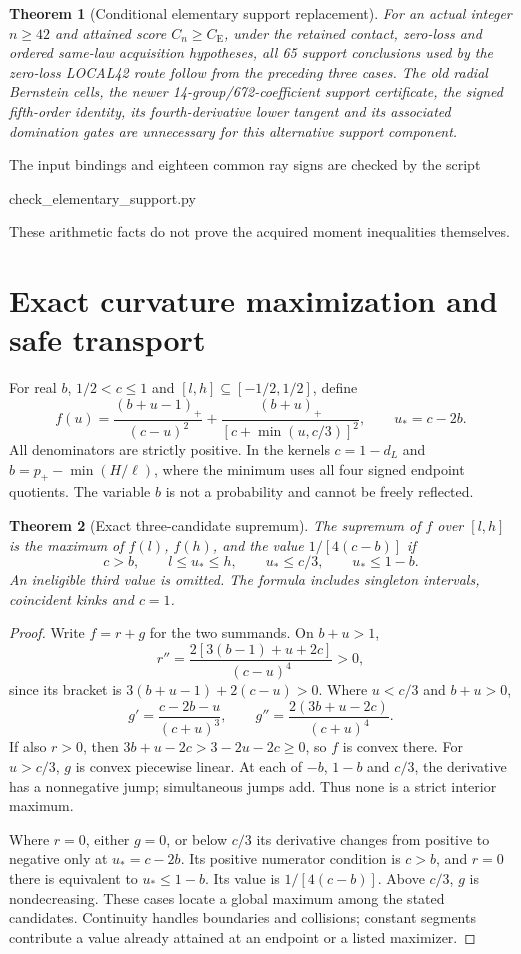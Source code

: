 \documentclass[11pt]{article}
\newtheorem{theorem}{Theorem}
\newcommand{\CE}{C_{\mathrm E}}
\newcommand{\pos}[1]{(#1)_+}
\begin{document}
\begin{theorem}[Conditional elementary support replacement]
For an actual integer $n\ge42$ and attained score $C_n\ge\CE$, under the
retained contact, zero-loss and ordered same-law acquisition
hypotheses, all 65 support conclusions used by the zero-loss LOCAL42 route
follow from the preceding three cases. The old radial Bernstein cells,
the newer 14-group/672-coefficient support certificate, the signed
fifth-order identity, its fourth-derivative lower tangent and its associated
domination gates are unnecessary for this alternative support component.
\end{theorem}
The input bindings and eighteen common ray signs are checked by the script
\begin{center}\ttfamily check\_elementary\_support.py\end{center}
These arithmetic facts do not prove
the acquired moment inequalities themselves.

\section{Exact curvature maximization and safe transport}
For real $b$, $1/2<c\le1$ and $[l,h]\subseteq[-1/2,1/2]$, define
\[
 f(u)=\frac{\pos{b+u-1}}{(c-u)^2}
       +\frac{\pos{b+u}}{[c+\min(u,c/3)]^2},\qquad u_*=c-2b.
\]
All denominators are strictly positive. In the kernels $c=1-d_L$ and
$b=p_+-\min(H/\ell)$, where the minimum uses all four signed endpoint
quotients. The variable $b$ is not a probability and cannot be freely
reflected.

\begin{theorem}[Exact three-candidate supremum]
The supremum of $f$ over $[l,h]$ is the maximum of $f(l)$, $f(h)$, and
the value $1/[4(c-b)]$ if
\[
 c>b,\qquad l\le u_*\le h,\qquad
 u_*\le c/3,\qquad u_*\le1-b.
\]
An ineligible third value is omitted. The formula includes singleton
intervals, coincident kinks and $c=1$.
\end{theorem}
\begin{proof}
Write $f=r+g$ for the two summands. On $b+u>1$,
\[
 r''=\frac{2[3(b-1)+u+2c]}{(c-u)^4}>0,
\]
since its bracket is $3(b+u-1)+2(c-u)>0$. Where $u<c/3$ and $b+u>0$,
\[
 g'=\frac{c-2b-u}{(c+u)^3},\qquad
 g''=\frac{2(3b+u-2c)}{(c+u)^4}.
\]
If also $r>0$, then $3b+u-2c>3-2u-2c\ge0$, so $f$ is convex there.
For $u>c/3$, $g$ is convex piecewise linear. At each of
$-b$, $1-b$ and $c/3$, the derivative has a nonnegative jump; simultaneous jumps
add. Thus none is a strict interior maximum.

Where $r=0$, either $g=0$, or below $c/3$ its derivative changes from
positive to negative only at $u_*=c-2b$. Its positive numerator condition
is $c>b$, and $r=0$ there is equivalent to $u_*\le1-b$.
Its value is $1/[4(c-b)]$. Above $c/3$, $g$ is nondecreasing.
These cases locate a global maximum among the stated candidates.
Continuity handles boundaries and collisions; constant segments contribute
a value already attained at an endpoint or a listed maximizer.
\end{proof}
\end{document}

